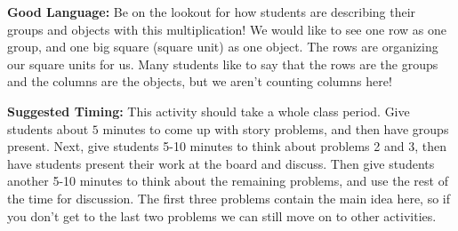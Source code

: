 \documentclass{ximera}
\begin{document}
\begin{instructorNotes}
\begin{itemize}
\end{itemize}

{\bf Good Language:} Be on the lookout for how students are describing their groups and objects with this multiplication! We would like to see one row as one group, and one big square (square unit) as one object. The rows are organizing our square units for us. Many students like to say that the rows are the groups and the columns are the objects, but we aren't counting columns here!

{\bf Suggested Timing:} This activity should take a whole class period. Give students about $5$ minutes to come up with story problems, and then have groups present. Next, give students 5-10 minutes to think about problems 2 and 3, then have students present their work at the board and discuss. Then give students another 5-10 minutes to think about the remaining problems, and use the rest of the time for discussion. The first three problems contain the main idea here, so if you don't get to the last two problems we can still move on to other activities.


\end{instructorNotes}
\end{document}
